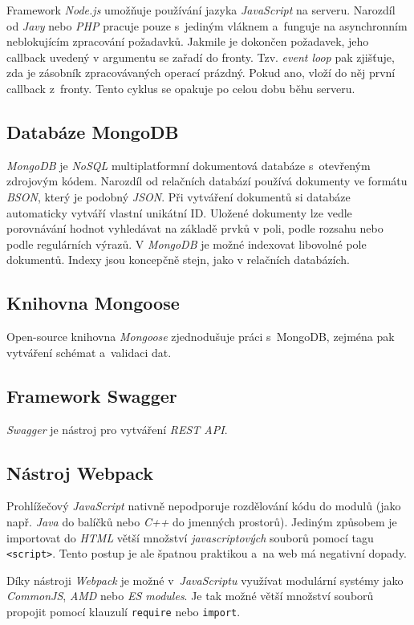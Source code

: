 \documentclass[a4paper,12pt]{article}
\def\code#1{\texttt{#1}}
\begin{document}
Framework \textit{Node.js} umožňuje používání jazyka \textit{JavaScript} na serveru. Narozdíl od \textit{Javy} nebo \textit{PHP} pracuje pouze s~jediným vláknem a~funguje na asynchronním neblokujícím zpracování požadavků. Jakmile je dokončen požadavek, jeho callback uvedený v argumentu se zařadí do fronty.  Tzv. \textit{event loop} pak zjišťuje, zda je zásobník zpracovávaných operací prázdný. Pokud ano, vloží do něj první callback z~fronty. Tento cyklus se opakuje po celou dobu běhu serveru.

\subsection{Databáze MongoDB}

\textit{MongoDB} je \textit{NoSQL} multiplatformní dokumentová databáze s~otevřeným zdrojovým kódem. Narozdíl od relačních databází používá dokumenty ve formátu \textit{BSON}, který je podobný \textit{JSON}. Při vytváření dokumentů si databáze automaticky vytváří vlastní unikátní ID.  Uložené dokumenty lze vedle porovnávání hodnot vyhledávat na základě prvků v poli, podle rozsahu nebo podle regulárních výrazů. V \textit{MongoDB} je možné indexovat libovolné pole dokumentů. Indexy jsou koncepčně stejn, jako v relačních databázích.

\subsection{Knihovna Mongoose}
Open-source knihovna \textit{Mongoose} zjednodušuje práci s~MongoDB, zejména pak vytváření schémat a~validaci dat.

\subsection{Framework Swagger}
\textit{Swagger} je nástroj pro vytváření \textit{REST API}.

\subsection{Nástroj Webpack}
Prohlížečový \textit{JavaScript} nativně nepodporuje rozdělování kódu do modulů (jako např. \textit{Java} do balíčků nebo \textit{C++} do jmenných prostorů). Jediným způsobem je importovat do \textit{HTML} větší množství \textit{javascriptových} souborů pomocí tagu \code{<script>}. Tento postup je ale špatnou praktikou a~na web má negativní dopady.

Díky nástroji \textit{Webpack} je možné v~\textit{JavaScriptu} využívat modulární systémy jako \textit{CommonJS}, \textit{AMD} nebo \textit{ES modules}. Je tak možné větší množství souborů propojit pomocí klauzulí \code{require} nebo \code{import}.
\end{document}
